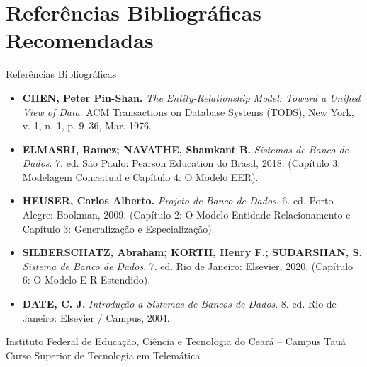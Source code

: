 \section[Referências]{Referências Bibliográficas Recomendadas}

\begin{frame}{Referências Bibliográficas}
  \begin{itemize}
    \scriptsize
    \item \textbf{CHEN, Peter Pin-Shan.} \textit{The Entity-Relationship Model: Toward a Unified View of Data}. ACM Transactions on Database Systems (TODS), New York, v. 1, n. 1, p. 9--36, Mar. 1976.
    \item \textbf{ELMASRI, Ramez; NAVATHE, Shamkant B.} \textit{Sistemas de Banco de Dados}. 7. ed. São Paulo: Pearson Education do Brasil, 2018. (Capítulo 3: Modelagem Conceitual e Capítulo 4: O Modelo EER).
    \item \textbf{HEUSER, Carlos Alberto.} \textit{Projeto de Banco de Dados}. 6. ed. Porto Alegre: Bookman, 2009. (Capítulo 2: O Modelo Entidade-Relacionamento e Capítulo 3: Generalização e Especialização).
    \item \textbf{SILBERSCHATZ, Abraham; KORTH, Henry F.; SUDARSHAN, S.} \textit{Sistema de Banco de Dados}. 7. ed. Rio de Janeiro: Elsevier, 2020. (Capítulo 6: O Modelo E-R Estendido).
    \item \textbf{DATE, C. J.} \textit{Introdução a Sistemas de Bancos de Dados}. 8. ed. Rio de Janeiro: Elsevier / Campus, 2004.
  \end{itemize}
  \vspace{0.15cm}
  \begin{center}
    \tiny\color{gray}
    Instituto Federal de Educação, Ciência e Tecnologia do Ceará -- Campus Tauá\\
    Curso Superior de Tecnologia em Telemática
  \end{center}
\end{frame}
